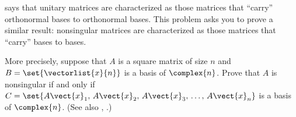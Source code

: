  says that unitary matrices are characterized as those matrices that ``carry'' orthonormal bases to orthonormal bases.  This problem asks you to prove a similar result:  nonsingular matrices are characterized as those matrices that ``carry'' bases to bases.\par
%
More precisely, suppose that $A$ is a square matrix of size $n$ and $B=\set{\vectorlist{x}{n}}$ is a basis of $\complex{n}$.  Prove that $A$ is nonsingular if and only if $C=\set{A\vect{x}_1,\,A\vect{x}_2,\,A\vect{x}_3,\,\dots,\,A\vect{x}_n}$ is a basis of $\complex{n}$.  (See also , .)